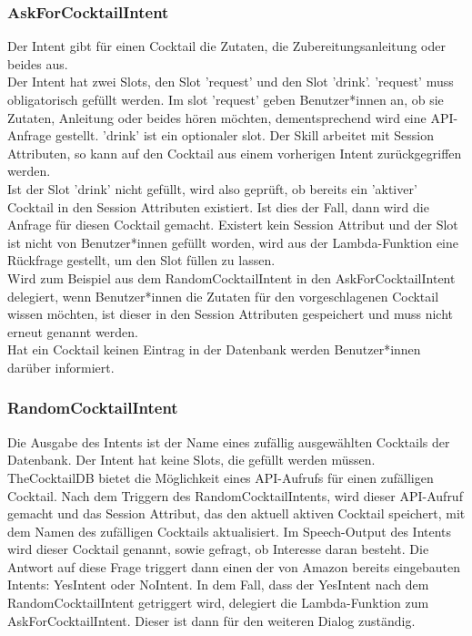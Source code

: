 \documentclass[12pt,letterpaper]{article}
\begin{document}
\subsubsection{AskForCocktailIntent}
Der Intent gibt für einen Cocktail die Zutaten, die Zubereitungsanleitung oder beides aus. \\
Der Intent hat zwei Slots, den Slot 'request' und den Slot 'drink'. 'request' muss obligatorisch gefüllt werden. Im slot 'request' geben Benutzer*innen an, ob sie Zutaten, Anleitung oder beides hören möchten, dementsprechend wird eine API-Anfrage gestellt. 'drink' ist ein optionaler slot. Der Skill arbeitet mit Session Attributen, so kann auf den Cocktail aus einem vorherigen Intent zurückgegriffen werden. \\
Ist der Slot 'drink' nicht gefüllt, wird also geprüft, ob bereits ein 'aktiver' Cocktail in den Session Attributen existiert. Ist dies der Fall, dann wird die Anfrage für diesen Cocktail gemacht. Existert kein Session Attribut und der Slot ist nicht von Benutzer*innen gefüllt worden, wird aus der Lambda-Funktion eine Rückfrage gestellt, um den Slot füllen zu lassen. \\
 Wird zum Beispiel aus dem RandomCocktailIntent in den AskForCocktailIntent delegiert, wenn Benutzer*innen die Zutaten für den vorgeschlagenen Cocktail wissen möchten, ist dieser in den Session Attributen gespeichert und muss nicht erneut genannt werden. \\
Hat ein Cocktail keinen Eintrag in der Datenbank werden Benutzer*innen darüber informiert. \\


\subsubsection{RandomCocktailIntent}
Die Ausgabe des Intents ist der Name eines zufällig ausgewählten Cocktails der Datenbank. Der Intent hat keine Slots, die gefüllt werden müssen. TheCocktailDB bietet die Möglichkeit eines API-Aufrufs für einen zufälligen Cocktail. Nach dem Triggern des RandomCocktailIntents, wird dieser API-Aufruf gemacht und das Session Attribut, das den aktuell aktiven Cocktail speichert, mit dem Namen des zufälligen Cocktails aktualisiert. Im Speech-Output des Intents wird dieser Cocktail genannt, sowie gefragt, ob Interesse daran besteht. Die Antwort auf diese Frage triggert dann einen der von Amazon bereits eingebauten Intents: YesIntent oder NoIntent. In dem Fall, dass der YesIntent nach dem RandomCocktailIntent getriggert wird, delegiert die Lambda-Funktion zum AskForCocktailIntent. Dieser ist dann für den weiteren Dialog zuständig.  \\

\end{document}
